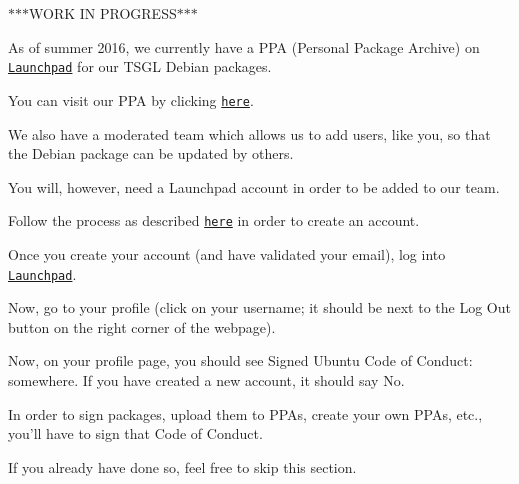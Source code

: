 $\ast$$\ast$$\ast$\-W\-O\-R\-K I\-N P\-R\-O\-G\-R\-E\-S\-S$\ast$$\ast$$\ast$

As of summer 2016, we currently have a P\-P\-A (Personal Package Archive) on \href{https://launchpad.net/}{\tt Launchpad} for our T\-S\-G\-L Debian packages.

You can visit our P\-P\-A by clicking \href{https://launchpad.net/~tsgl-test/+archive/ubuntu/tsgl-dev}{\tt here}.

We also have a moderated team which allows us to add users, like you, so that the Debian package can be updated by others.

You will, however, need a Launchpad account in order to be added to our team.

Follow the process as described \href{https://login.launchpad.net/+new_account}{\tt here} in order to create an account.

Once you create your account (and have validated your email), log into \href{https://launchpad.net/}{\tt Launchpad}.

Now, go to your profile (click on your username; it should be next to the {\ttfamily Log Out} button on the right corner of the webpage).

Now, on your profile page, you should see {\ttfamily Signed Ubuntu Code of Conduct\-:} somewhere. If you have created a new account, it should say {\ttfamily No}.

In order to sign packages, upload them to P\-P\-As, create your own P\-P\-As, etc., you'll have to sign that Code of Conduct.

If you already have done so, feel free to skip this section. 